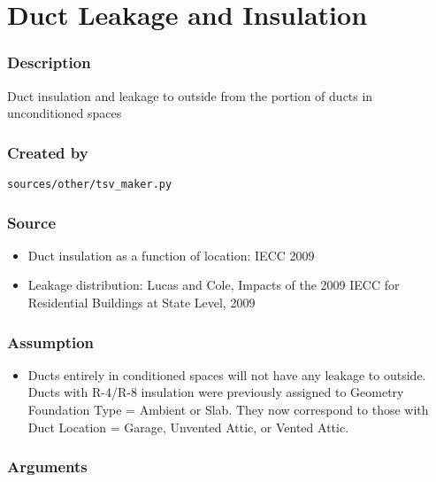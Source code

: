 \section{Duct Leakage and
Insulation}\label{duct_leakage_and_insulation}

\subsubsection{Description}\label{description-36}

Duct insulation and leakage to outside from the portion of ducts in
unconditioned spaces

\subsubsection{Created by}\label{created-by-36}

\texttt{sources/other/tsv\_maker.py}

\subsubsection{Source}\label{source-35}

\begin{itemize}
 
\item
  Duct insulation as a function of location: IECC 2009
\item
  Leakage distribution: Lucas and Cole, \textquotesingle Impacts of the
  2009 IECC for Residential Buildings at State Level\textquotesingle,
  2009
\end{itemize}

\subsubsection{Assumption}\label{assumption-19}

\begin{itemize}
 
\item
  Ducts entirely in conditioned spaces will not have any leakage to
  outside. Ducts with R-4/R-8 insulation were previously assigned to
  Geometry Foundation Type = Ambient or Slab. They now correspond to
  those with Duct Location = Garage, Unvented Attic, or Vented Attic.
\end{itemize}

\subsubsection{Arguments}\label{arguments-23}

